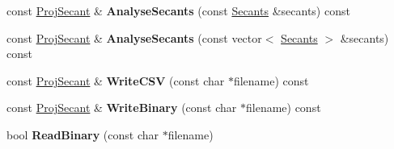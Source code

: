 \begin{DoxyCompactItemize}
\item 
\hypertarget{struct_d_r_d_s_p_1_1_proj_secant_a4c12f28ba578c22c206b0d92ad6eb490}{const \hyperlink{struct_d_r_d_s_p_1_1_proj_secant}{Proj\-Secant} \& {\bfseries Analyse\-Secants} (const \hyperlink{struct_d_r_d_s_p_1_1_secants}{Secants} \&secants) const }\label{struct_d_r_d_s_p_1_1_proj_secant_a4c12f28ba578c22c206b0d92ad6eb490}

\item 
\hypertarget{struct_d_r_d_s_p_1_1_proj_secant_a314a6742c209f41d347eaf652db24761}{const \hyperlink{struct_d_r_d_s_p_1_1_proj_secant}{Proj\-Secant} \& {\bfseries Analyse\-Secants} (const vector$<$ \hyperlink{struct_d_r_d_s_p_1_1_secants}{Secants} $>$ \&secants) const }\label{struct_d_r_d_s_p_1_1_proj_secant_a314a6742c209f41d347eaf652db24761}

\item 
\hypertarget{struct_d_r_d_s_p_1_1_proj_secant_a1b8c61ea307a758c789ae424cd72006c}{const \hyperlink{struct_d_r_d_s_p_1_1_proj_secant}{Proj\-Secant} \& {\bfseries Write\-C\-S\-V} (const char $\ast$filename) const }\label{struct_d_r_d_s_p_1_1_proj_secant_a1b8c61ea307a758c789ae424cd72006c}

\item 
\hypertarget{struct_d_r_d_s_p_1_1_proj_secant_afbb9d6b0aa69ba44619363a69d7f7cef}{const \hyperlink{struct_d_r_d_s_p_1_1_proj_secant}{Proj\-Secant} \& {\bfseries Write\-Binary} (const char $\ast$filename) const }\label{struct_d_r_d_s_p_1_1_proj_secant_afbb9d6b0aa69ba44619363a69d7f7cef}

\item 
\hypertarget{struct_d_r_d_s_p_1_1_proj_secant_ae37dfe0f561f61c3ecfda5abc02e8b25}{bool {\bfseries Read\-Binary} (const char $\ast$filename)}\label{struct_d_r_d_s_p_1_1_proj_secant_ae37dfe0f561f61c3ecfda5abc02e8b25}

\end{DoxyCompactItemize}
